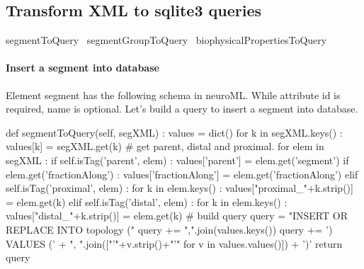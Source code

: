 \documentclass[]{article}%
\begin{document}
\eatline
{}\nwendcode{}\nwdocspar
\subsection{Transform XML to sqlite3 queries}
\label{subsec:transform}

\nwenddocs{}\plusendmoddef\nwstartdeflinemarkup{}\nwenddeflinemarkup
\LA{}segmentToQuery~{\nwtagstyle{}}\RA{}
\LA{}segmentGroupToQuery~{\nwtagstyle{}}\RA{}
\LA{}biophysicalPropertiesToQuery~{\nwtagstyle{}}\RA{}

\eatline
{}\nwendcode{}\nwdocspar
\paragraph{Insert a segment into database}
    
    Element {\Tt{}segment\nwendquote} has the following schema in neuroML. While attribute
    {\Tt{}id\nwendquote} is required, {\Tt{}name\nwendquote} is optional. Let's build a query to insert a
    {\Tt{}segment\nwendquote} into database.



\nwenddocs{}\plusendmoddef\nwstartdeflinemarkup{}\nwenddeflinemarkup
def segmentToQuery(self, segXML) :
    values = dict()
    for k in segXML.keys() :
      values[k] = segXML.get(k)
    # get parent, distal and proximal.
    for elem in segXML :
      if self.isTag('parent', elem) :
        values['parent'] = elem.get('segment')
        if elem.get('fractionAlong') :
          values['fractionAlong'] =  elem.get('fractionAlong')
      elif self.isTag('proximal', elem) :
        for k in elem.keys() :
          values["proximal_"+k.strip()] = elem.get(k)
      elif self.isTag('distal', elem) :
        for k in elem.keys() :
          values["distal_"+k.strip()] = elem.get(k)
    # build query
    query = "INSERT OR REPLACE INTO topology ("
    query += ",".join(values.keys())
    query += ') VALUES (' + ", ".join(["'"+v.strip()+"'" for v in values.values()]) + ')'
    return query
\eatline
{}\nwendcode{}\nwdocspar
\end{document}

